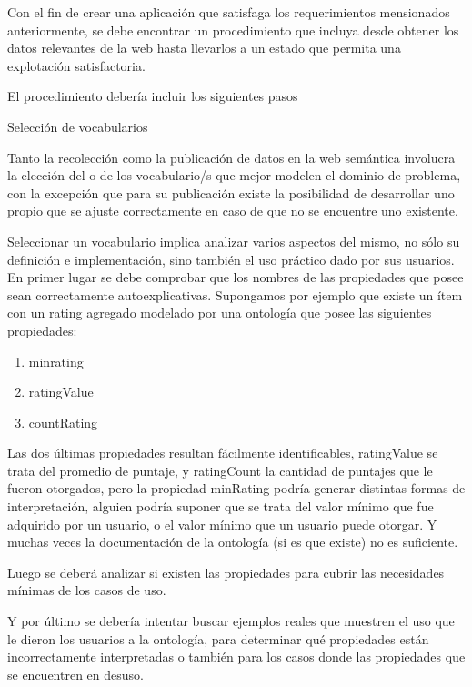 Con el fin de crear una aplicación que satisfaga los requerimientos mensionados anteriormente, se debe encontrar
un procedimiento que incluya desde obtener los datos relevantes de la web hasta llevarlos a un estado que permita una 
explotación satisfactoria. 

El procedimiento debería incluir los siguientes pasos 

%
Selección de vocabularios

%
Tanto la recolección como la publicación de datos en la web semántica involucra la elección del o de los vocabulario/s que 
mejor modelen el dominio de problema, con la excepción que para su publicación existe la posibilidad de desarrollar uno propio que se ajuste correctamente en caso de que no se encuentre uno existente. 

Seleccionar un vocabulario implica analizar varios aspectos del mismo, no sólo su definición e implementación, sino también el uso práctico dado por sus usuarios. 
En primer lugar se debe comprobar que los nombres de las propiedades que posee sean correctamente autoexplicativas. Supongamos por ejemplo que existe un ítem con un rating agregado modelado por una ontología que posee las siguientes propiedades:

\begin{enumerate}
\item minrating
\item ratingValue
\item countRating
\end{enumerate}


Las dos últimas propiedades resultan fácilmente identificables, ratingValue se trata del promedio de puntaje, y ratingCount 
la cantidad de puntajes que le fueron otorgados, pero la propiedad minRating podría generar distintas formas de interpretación, 
alguien podría suponer que se trata del valor mínimo que fue adquirido por un usuario, o el valor mínimo que un usuario puede 
otorgar. Y muchas veces la documentación de la ontología (si es que existe) no es suficiente.

Luego se deberá analizar si existen las propiedades para cubrir las necesidades mínimas de los casos de uso.

Y por último se debería intentar buscar ejemplos reales que muestren el uso que le dieron los usuarios a la ontología, para 
determinar qué propiedades están incorrectamente interpretadas o también para los casos donde las propiedades que se encuentren 
en desuso.


